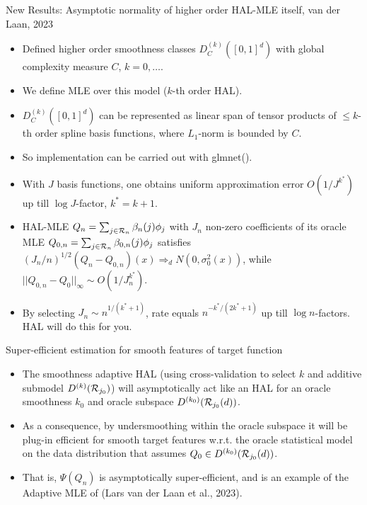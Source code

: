 \documentclass[t]{beamer}
\begin{document}
\begin{frame}{New Results: Asymptotic normality of higher order HAL-MLE itself, van der Laan, 2023}
\begin{itemize}
\item Defined higher order smoothness classes $D^{(k)}_C([0,1]^d)$ with global complexity measure $C$, $k=0,\ldots$.
\item We define MLE over this model ($k$-th order HAL).
\item $D^{(k)}_C([0,1]^d)$ can be represented as linear span of tensor products of $\leq k$-th order spline basis functions, where  $L_1$-norm is bounded by $C$.
\item So implementation can be carried out with glmnet().
\item With $J$ basis functions, one obtains uniform approximation error $O(1/J^{k^*})$ up till $\log J$-factor, $k^*=k+1$.
 \item HAL-MLE $Q_n=\sum_{j\in {\cal R}_n}\beta_n(j)\phi_j$ with $J_n$  non-zero coefficients of its oracle MLE  $Q_{0,n}=\sum_{j\in {\cal R}_n}\beta_{0,n}(j)\phi_j$ satisfies $(J_n/n)^{1/2}(Q_n-Q_{0,n})(x)\Rightarrow_d N(0,\sigma^2_0(x))$, while $|| Q_{0,n}-Q_0 ||_{\infty}\sim O(1/J_n^{k^*})$.
\item By selecting $J_n\sim n^{1/(k^*+1)}$, rate equals $n^{-k^*/(2k^*+1)}$ up till $\log n$-factors. HAL will do this for you.
\end{itemize}
\end{frame}

\begin{frame}{Super-efficient estimation for smooth features of target function}
\begin{itemize}
\item The smoothness adaptive HAL (using cross-validation to select $k$ and additive submodel $D^{(k)}({\cal R}_{j_0})$) will asymptotically act like an HAL for an oracle smoothness $k_0$ and oracle subspace $D^{(k_0)}({\cal R}_{j_0}(d))$.
\item As a consequence, by undersmoothing within the oracle subspace it will be plug-in efficient for smooth target features w.r.t. the oracle statistical model on the data distribution that assumes $Q_0\in D^{(k_0)}({\cal R}_{j_0}(d))$.
\item That is, $\Psi(Q_n)$ is asymptotically super-efficient, and is an example of the Adaptive MLE of  (Lars van der Laan et al., 2023).
\end{itemize}
\end{frame}
\end{document}
